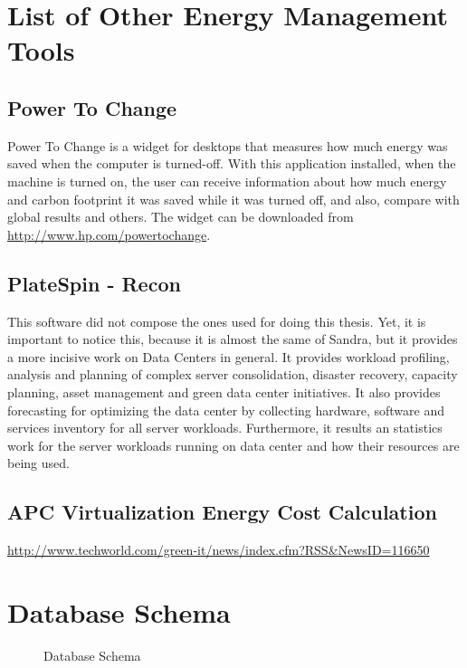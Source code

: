     
    
\chapter{List of Other Energy Management Tools} \label{app:list_other_energy_management_tools}
    \section{Power To Change} \label{app:power_to_change}
    Power To Change is a widget for desktops that measures how much energy was saved when the computer is turned-off. With this application installed, when the machine is turned on, the user can receive information about how much energy and carbon footprint it was saved while it was turned off, and also, compare with global results and others.
    The widget can be downloaded from \url{http://www.hp.com/powertochange}.

    \section{PlateSpin - Recon} \label{app:power_recon}
    This software did not compose the ones used for doing this thesis. Yet, it is important to notice this, because it is almost the same of Sandra, but it provides a more incisive work on Data Centers in general. It provides workload profiling, analysis and planning of complex server consolidation, disaster recovery, capacity planning, asset management and green data center initiatives. It also provides forecasting for optimizing the data center by collecting hardware, software and services inventory for all server workloads. Furthermore, it results an statistics work for the server workloads running on data center and how their resources are being used.
    
    \section{APC Virtualization Energy Cost Calculation}\label{app:apc_virtualization_energy_cost_calculation}
        \url{http://www.techworld.com/green-it/news/index.cfm?RSS&NewsID=116650}
    
\chapter{Database Schema} \label{app:database_schema}
\begin{sidewaysfigure}[h!tb]
    \centering
    \caption{Database Schema}
    \label{fig:database_schema}
\end{sidewaysfigure}
